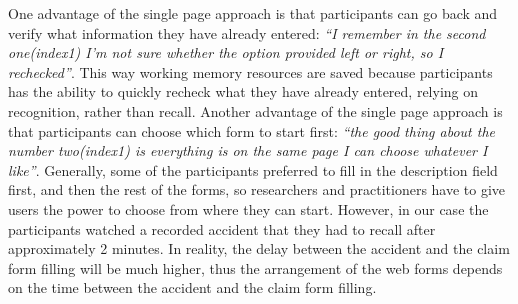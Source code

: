 \documentclass[../main/Replicate.tex]{subfiles}
\begin{document}
	One advantage of the single page approach is that participants can go back and verify what information they have already entered: \textit{``I remember in the second one(index1) I'm not sure whether the option provided left or right, so I rechecked''}. This way working memory resources are saved because participants has the ability to quickly recheck what they have already entered, relying on recognition, rather than recall\cite{nielsen1990heuristic}. Another advantage of the single page approach is that participants can choose which form to start first: \textit{``the good thing about the number two(index1) is everything is on the same page I can choose whatever I like''}. Generally, some of the participants preferred to fill in the description field first, and then the rest of the forms, so researchers and practitioners have to give users the power to choose from where they can start. However, in our case the participants watched a recorded accident that they had to recall after approximately 2 minutes. In reality, the delay between the accident and the claim form filling will be much higher, thus the arrangement of the web forms depends on the time between the accident and the claim form filling.
\end{document}
